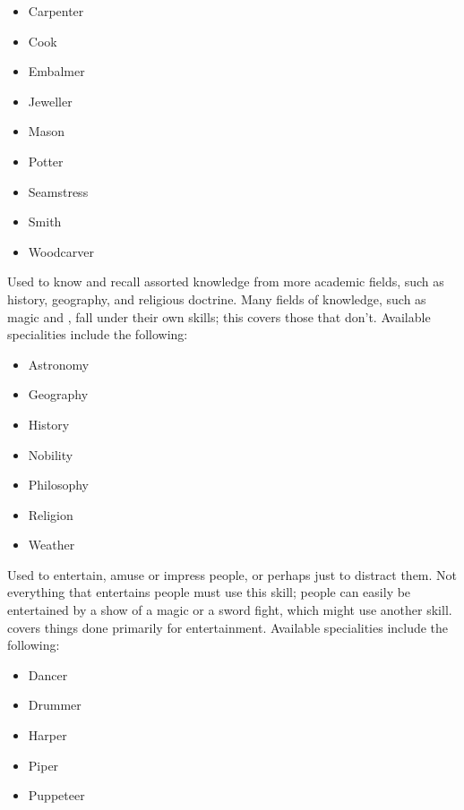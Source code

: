 \begin{itemize}
	\item Carpenter
	\item Cook
	\item Embalmer
	\item Jeweller
	\item Mason
	\item Potter
	\item Seamstress
	\item Smith
	\item Woodcarver
\end{itemize}


Used to know and recall assorted knowledge from more academic fields, such as history, geography, and religious doctrine. %
Many fields of knowledge, such as magic and , fall under their own skills; this covers those that don't.
Available specialities include the following:

\begin{itemize}
	\item Astronomy
	\item Geography
	\item History
	\item Nobility
	\item Philosophy
	\item Religion %
	\item Weather
\end{itemize}


Used to entertain, amuse or impress people, or perhaps just to distract them.
Not everything that entertains people must use this skill; people can easily be entertained by a show of a magic or a sword fight, which might use another skill.
 covers things done primarily for entertainment.
Available specialities include the following:

\begin{itemize}
	\item Dancer
	\item Drummer
	\item Harper
	\item Piper
	\item Puppeteer
\end{itemize}
